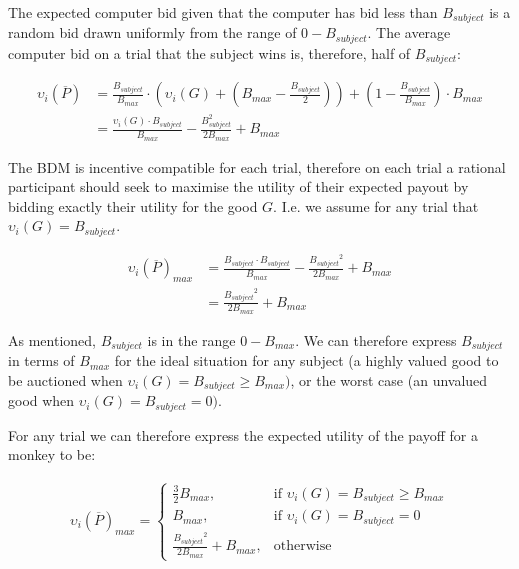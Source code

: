 The expected computer bid given that the computer has bid less than $B_{subject}$ is a random bid drawn uniformly from the range of $0-B_{subject}$. The average computer bid on a trial that the subject wins is, therefore, half of $B_{subject}$: 

\begin{equation}
\begin{aligned}
\upsilon_i(\overline{P}) &= \frac{B_{subject}}{B_{max}} \cdot \left(\upsilon_i(G) + \left(B_{max} - \frac{B_{subject}}{2}\right)\right) + \left(1 - \frac{B_{subject}}{B_{max}}\right) \cdot B_{max} \\
&= \frac{\upsilon_i(G) \cdot B_{subject}}{B_{max}} - \frac{B_{subject}^2}{2B_{max}} + B_{max}
\end{aligned}
\label{eq:bdm_payoff6}
\end{equation}

The BDM is incentive compatible for each trial, therefore on each trial a rational participant should seek to maximise the utility of their expected payout by bidding exactly their utility for the good $G$. I.e. we assume for any trial that $\upsilon_i (G) = B_{subject}$.

\begin{equation}
\begin{aligned}
\upsilon_i(\overline{P})_{max} &= \frac{B_{subject} \cdot B_{subject}}{B_{max}} - \frac{{B_{subject}}^2}{2B_{max}} + B_{max} \\
&= \frac{{B_{subject}}^2}{2B_{max}} + B_{max}
\end{aligned}
\label{eq:bdm_payoff7}
\end{equation}

As mentioned, $B_{subject}$ is in the range $0-B_{max}$. We can therefore express $B_{subject}$ in terms of $B_{max}$ for the ideal situation for any subject (a highly valued good to be auctioned when $\upsilon_i (G) = B_{subject} \geq B_{max})$, or the worst case (an unvalued good when $\upsilon_i (G) = B_{subject} = 0)$.

For any trial we can therefore express the expected utility of the payoff for a monkey to be:

\begin{equation}
\begin{aligned}
\upsilon_i(\overline{P})_{max} = \begin{cases}
\frac{3}{2} B_{max}, & \text{if } \upsilon_i(G) = B_{subject} \geq B_{max} \\
B_{max}, & \text{if } \upsilon_i(G) = B_{subject} = 0 \\
\frac{{B_{subject}}^2}{2B_{max}} + B_{max}, & \text{otherwise}
\end{cases}
\end{aligned}
\label{eq:bdm_payoff8}
\end{equation}


